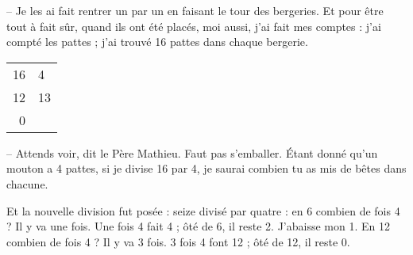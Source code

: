 {-- Je les ai fait rentrer un par un en faisant le tour des bergeries.
Et pour \^etre tout \`a fait s\^ur, quand ils ont \'et\'e plac\'es, moi aussi,
j'ai fait mes comptes : j'ai compt\'e les pattes ; j'ai trouv\'e 16 pattes dans
chaque bergerie.

\begin{floatingtable}[r]{
\begin{tabular}{r|l}
{\large 16} & {\large 4} \\
\cline {2-2}
{\large 12} & {\large 13}\\
{\large 0}  & \\
\end{tabular} }\end{floatingtable}

-- Attends voir, dit le P\`ere Mathieu. Faut pas s'emballer. \'Etant donn\'e qu'un
mouton a 4 pattes, si je divise 16 par 4, je saurai combien tu as mis de b\^etes
dans chacune.

	Et la nouvelle division fut pos\'ee : seize divis\'e par quatre :
	en 6 combien de fois 4 ? Il y va une fois. Une fois 4 fait 4 ;
	\^ot\'e de 6, il reste 2. J'abaisse mon 1. En 12 combien de fois 4 ?
	Il y va 3 fois. 3 fois 4 font 12 ; \^ot\'e de 12, il reste 0.
} 
